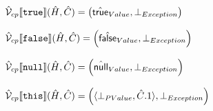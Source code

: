 \documentclass{article}
\newcommand{\SF}[1]{\mbox{\textsf{#1}}}
\newcommand{\TT}[1]{\mbox{\texttt{#1}}}
\newcommand{\aV}{\hat{\mathcal{V}}}
\newcommand{\lbr}{\llbracket}
\newcommand{\rbr}{\rrbracket}
\newcommand{\atrue}{\hat{\SF{true}}}
\newcommand{\afalse}{\hat{\SF{false}}}
\newcommand{\anull}{\hat{\SF{null}}}
\begin{document}
\[\begin{array}{ll}
\aV_{cp}\lbr \TT{true} \rbr(\hat{H},\hat{C}) = \left(\atrue_{Value},\bot_{Exception}\right)\\\\

\aV_{cp}\lbr \TT{false} \rbr(\hat{H},\hat{C}) = \left(\afalse_{Value},\bot_{Exception}\right)\\\\

\aV_{cp}\lbr\TT{null}\rbr (\hat{H},\hat{C}) = \left(\anull_{Value},\bot_{Exception}\right)\\\\

\aV_{cp}\lbr \TT{this}\rbr (\hat{H},\hat{C}) = \left(\langle\bot_{PValue},\hat{C}.1\rangle,\bot_{Exception}\right)
\\\\
\end{array}
\]
\end{document}
